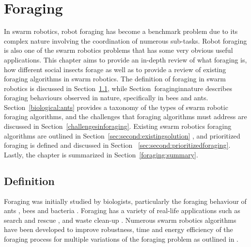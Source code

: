 
\chapter{Foraging}
\label{chap:second}


In swarm robotics, robot foraging has become a benchmark problem due to its complex nature involving the coordination of numerous sub-tasks. Robot foraging is also one of the swarm robotics problems that has some very obvious useful applications. This chapter aims to provide an in-depth review of what foraging is, how different social insects forage as well as to provide a review of existing foraging algorithms in swarm robotics. The definition of foraging in swarm robotics is discussed in Section~\ref{sec:second:definition}, while Section~{foraginginnature} describes foraging behaviours observed in nature, specifically in bees and ants. Section~\ref{biological:ants} provides a taxonomy of the types of swarm robotic foraging algorithms, and the challenges that foraging algorithms must address are discussed in Section~\ref{challengesinforaging}. Existing swarm robotics foraging algorithms are outlined in Section~\ref{sec:second:existingsolution} , and prioritized foraging is defined and discussed in Section~
\ref{sec:second:prioritizedforaging}. Lastly, the chapter is summarized in Section~\ref{foraging:summary}. 



\section{Definition}
\label{sec:second:definition}

Foraging was initially studied by biologists, particularly the foraging behaviour of ants \cite{holldobler1990ants,bernstein1974seasonal}, bees \cite{seeley2009wisdom} and bacteria \cite{resnick1994turtles}. Foraging has a variety of real-life applications such as search and rescue \cite{jennings1997cooperative,murphy2000biomimetic}, and waste clean-up \cite{balch1995io}. Numerous swarm robotics algorithms have been developed to improve robustness, time and energy efficiency of the foraging process for multiple variations of the foraging problem as outlined in \cite{winfield2009foraging}. 

